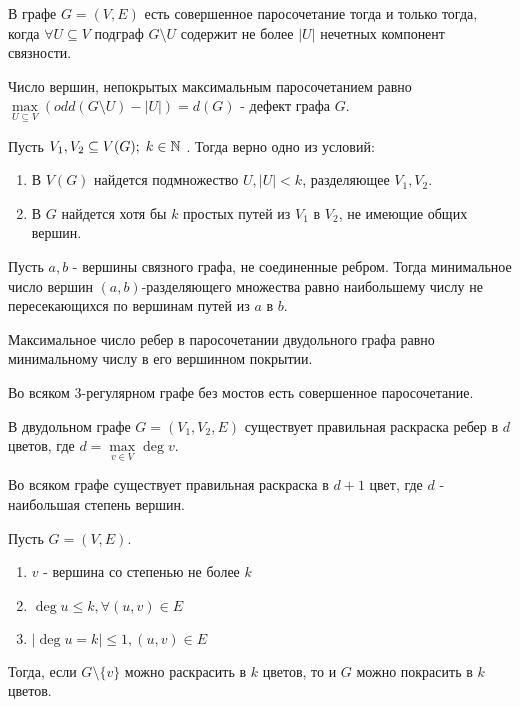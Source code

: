 \documentclass[12pt]{article}
\begin{document}
\begin{thm}[Татта, 1947]
    В графе $G = (V, E)$ есть совершенное паросочетание тогда и только тогда, когда $\forall U \subseteq V$ подграф $G \setminus U$ содержит не более $|U|$ нечетных компонент связности.
\end{thm}
\begin{thm}
    Число вершин, непокрытых максимальным паросочетанием равно $\max\limits_{U \subseteq V} ( odd(G \setminus U) - |U|) = d(G)$ - дефект графа $G$.
\end{thm}
\begin{thm}[Геринг, 2000]
    Пусть $V_1, V_2 \subseteq V(G); \; k \in  \mathbb{N}$ . Тогда верно одно из условий: 
    \begin{enumerate}
	\item В $V(G)$ найдется подмножество $U, |U| < k$, разделяющее $V_1, V_2$.
	\item В $G$ найдется хотя бы $k$ простых путей из $V_1$ в $V_2$, не имеющие общих вершин.
    \end{enumerate}
\end{thm}
\begin{thm}[Менгер, 1927]
    Пусть $a, b$ - вершины связного графа, не соединенные ребром. Тогда минимальное число вершин $(a, b)$-разделяющего множества равно наибольшему числу не пересекающихся по вершинам путей из $a$ в $b$.
\end{thm}
\begin{thm}[Кёнинг, 1931]
    Максимальное число ребер в паросочетании двудольного графа равно минимальному числу в его вершинном покрытии.
\end{thm}
\begin{thm}[Петерсон, 1891]
    Во всяком 3-регулярном графе без мостов есть совершенное паросочетание.
\end{thm}
\begin{thm}
    В двудольном графе $G = (V_1, V_2, E)$ существует правильная раскраска ребер в $d$ цветов, где $d = \max\limits_{v \in V} \deg v$.
\end{thm}
\begin{thm}[Визинг, 1964]
    Во всяком графе существует правильная раскраска в $d + 1$ цвет, где $d$ - наибольшая степень вершин.
\end{thm}
\begin{lm}
    Пусть $G=(V, E)$.
    $ $
    \begin{enumerate}
        \item $v$ - вершина со степенью не более $k$ 
	\item $\deg u \le k, \forall (u, v) \in  E$
	\item $|\deg u = k| \le 1, (u, v) \in E$
    \end{enumerate}
    Тогда, если $G \setminus \{v\}$ можно раскрасить в $k$ цветов, то и $G$ можно покрасить в $k$ цветов.
\end{lm}
\end{document}
